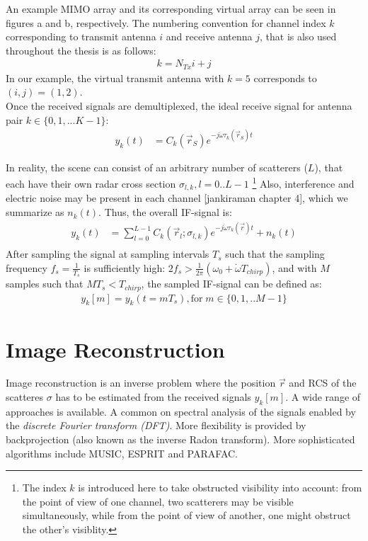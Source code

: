 An example MIMO array and its corresponding virtual array can be seen in figures a and b, respectively.
The numbering convention for channel index $k$ corresponding to transmit antenna $i$ and receive antenna $j$,
that is also used throughout the thesis is as follows:
\begin{align}
    k = N_{Tx}i + j
\end{align}
In our example, the virtual transmit antenna with $k=5$ corresponds to $(i,j)=(1,2)$. \\


Once the received signals are demultiplexed, the ideal receive signal for antenna pair $k \in \{0,1,...K-1\}$:
\begin{align}
    y_k(t) & = C_k(\vec r_S)e^{-j\dot\omega\tau_k(\vec r_S)t} \label{eqn:ideal_scatterer}
\end{align}

In reality, the scene can consist of an arbitrary number of scatterers ($L$),
that each have their own radar cross section $\sigma_{l,k}, l=0..L-1$
\footnote{
    The index $k$ is introduced here to take obstructed visibility into account:
    from the point of view of one channel, two scatterers may be visible simultaneously,
    while from the point of view of another, one might obstruct the other's visiblity.
}
Also, interference and electric noise may be present in each channel [jankiraman chapter 4],
which we summarize as $n_k(t)$.
Thus, the overall IF-signal is:
\begin{align}
    y_k(t) & = \sum_{l=0}^{L-1} C_k(\vec r_l; \sigma_{l,k}) e^{-j\dot\omega\tau_k(\vec r)t} + n_k(t) \\
\end{align}
After sampling the signal at sampling intervals $T_s$ such that the sampling frequency $f_s = \frac{1}{T_s}$
is sufficiently high: ${2f_s > \frac{1}{2\pi}(\omega_0 + \dot \omega T_{chirp})}$, and with $M$ samples such that $MT_s < T_{chirp}$,
the sampled IF-signal can be defined as:
\begin{align}
    y_k[m] = y_k(t=mT_s), \text{for}\;m \in \{0,1,..M-1\}
\end{align}

\section{Image Reconstruction}
Image reconstruction is an inverse problem where the position $\vec r$ and RCS of the scatteres $\sigma$
has to be estimated from the received signals $y_k[m]$.
A wide range of approaches is available.
A common on spectral analysis of the signals enabled by the \emph{discrete Fourier transform (DFT)}.
More flexibility is provided by backprojection (also known as the inverse Radon transform).
More sophisticated algorithms include MUSIC, ESPRIT and PARAFAC.

